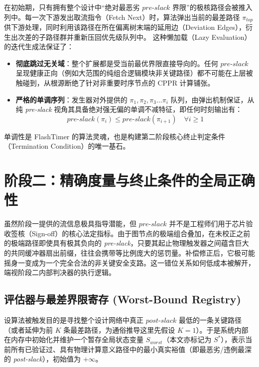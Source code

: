 在初始期，只有拥有整个设计中“绝对最恶劣 $pre\text{-}slack$ 界限”的极核路径会被推入列中。每一次下游发出取流指令（Fetch Next）时，算法弹出当前的最差路径 $\pi_{top}$ 供下游处理，同时利用该路径在所在偏离树末端的延用边（Deviation Edges），衍生出次差的子路径群并重新压回优先级队列中。
这种懒加载（Lazy Evaluation）的迭代生成法保证了：
\begin{itemize}
    \item \textbf{彻底跳过无关域}：整个扩展都是受当前最优界限直接导向的。任何 $pre\text{-}slack$ 呈现健康正向（例如大范围的纯组合逻辑模块非关键路径）都不可能在上层被触碰到，从根源断绝了针对非重要时序节点的 CPPR 计算铺张。
    \item \textbf{严格的单调序列}：发生器对外提供的 $\pi_1, \pi_2, \pi_3 \dots \pi_i$ 队列，由弹出机制保证，从纯 \textit{pre-slack} 视角其具备绝对强无偏的单调不减特征，即任何时刻输出有：
    \begin{equation}
        pre\text{-}slack(\pi_i) \leq pre\text{-}slack(\pi_{i+1}) \quad \forall i \ge 1
    \end{equation}
\end{itemize}

单调性是 FlashTimer 的算法灵魂，也是构建第二阶段核心终止判定条件（Termination Condition）的唯一基石。

\section{阶段二：精确度量与终止条件的全局正确性}
\label{sec:stage_two_evaluation}

虽然阶段一提供的流信息极具指导潜能，但 $pre\text{-}slack$ 并不是工程师们用于芯片验收签核（Sign-off）的核心法定指标。由于图节点的极端组合叠加，在未校正之前的极端路径即使具有极其负向的 \textit{pre-slack}，只要其起止物理触发器之间蕴含巨大的共同缓冲器扇出前缀，往往会携带等比例庞大的惩罚量。补偿修正后，它极可能摇身一变成为一个完全合法的非关键安全支路。这一错位关系如何低成本被解开，端视阶段二内部判决器的执行逻辑。

\subsection{评估器与最差界限寄存 (Worst-Bound Registry)}
设算法被触发目的是寻找整个设计网络中真正 $post\text{-}slack$ 最低的一条关键路径（或者延伸为前 $K$ 条最差路径，为通俗推导这里先假设 $K=1$）。于是系统内部在内存中初始化并维护一个暂存全局状态变量 $S_{worst}$（本文亦标记为 $S^*$），表示当前所有已验证过、具有物理计算意义路径中的最小真实裕值（即最恶劣/违例最深的 \textit{post-slack}），初始值为 $+\infty$。

